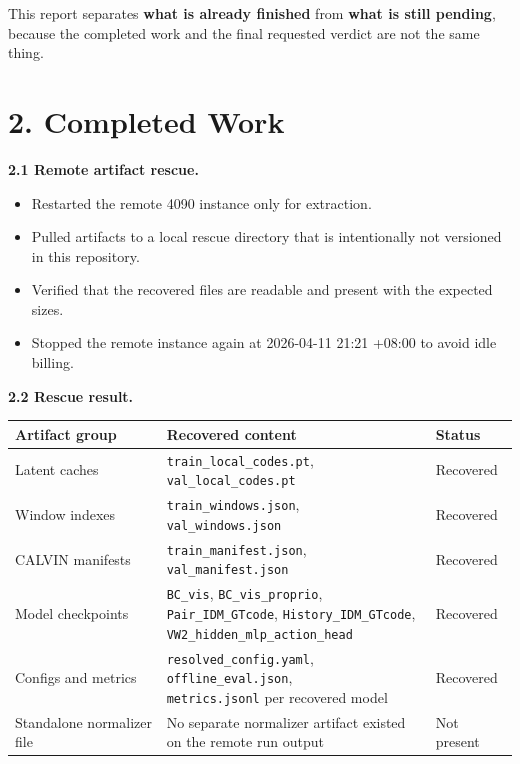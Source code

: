\documentclass[11pt]{article}
\begin{document}
This report separates \textbf{what is already finished} from \textbf{what is still pending}, because the completed work and the final requested verdict are not the same thing.

\section*{2. Completed Work}
\textbf{2.1 Remote artifact rescue.}
\begin{itemize}
  \item Restarted the remote 4090 instance only for extraction.
  \item Pulled artifacts to a local rescue directory that is intentionally not versioned in this repository.
  \item Verified that the recovered files are readable and present with the expected sizes.
  \item Stopped the remote instance again at 2026-04-11 21:21 +08:00 to avoid idle billing.
\end{itemize}

\textbf{2.2 Rescue result.}
\begin{center}
\small
\begin{tabular}{@{}l l l@{}}
\toprule
\textbf{Artifact group} & \textbf{Recovered content} & \textbf{Status} \\
\midrule
Latent caches & \shortstack[l]{\texttt{train\_local\_codes.pt},\\ \texttt{val\_local\_codes.pt}} & \textcolor{ReportGood}{Recovered} \\
Window indexes & \shortstack[l]{\texttt{train\_windows.json},\\ \texttt{val\_windows.json}} & \textcolor{ReportGood}{Recovered} \\
CALVIN manifests & \shortstack[l]{\texttt{train\_manifest.json},\\ \texttt{val\_manifest.json}} & \textcolor{ReportGood}{Recovered} \\
Model checkpoints & \shortstack[l]{\texttt{BC\_vis}, \texttt{BC\_vis\_proprio},\\ \texttt{Pair\_IDM\_GTcode}, \texttt{History\_IDM\_GTcode},\\ \texttt{VW2\_hidden\_mlp\_action\_head}} & \textcolor{ReportGood}{Recovered} \\
Configs and metrics & \shortstack[l]{\texttt{resolved\_config.yaml}, \texttt{offline\_eval.json},\\ \texttt{metrics.jsonl} per recovered model} & \textcolor{ReportGood}{Recovered} \\
Standalone normalizer file & \shortstack[l]{No separate normalizer artifact existed\\ on the remote run output} & \textcolor{ReportWarn}{Not present} \\
\bottomrule
\end{tabular}
\end{center}
\end{document}

